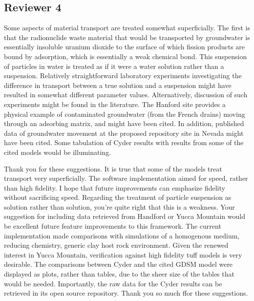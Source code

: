 \documentclass[answers,12pt]{exam}
\begin{document}
\begin{questions}
\section*{Reviewer 4}

\question  Some aspects of material transport are treated somewhat 
superficially. The
first is that the radionuclide waste material that would be transported by
groundwater is essentially insoluble uranium dioxide to the surface of which
fission products are bound by adsorption, which is essentially a weak chemical
bond.  This suspension of particles in water is treated as if it were a water
solution rather than a suspension.  Relatively straightforward laboratory
experiments investigating the difference in transport between a true solution
and a suspension might have resulted in somewhat different parameter values.
Alternatively, discussion of such experiments might be found in the literature.
The Hanford site provides a physical example of contaminated groundwater (from
the French drains) moving through an adsorbing matrix, and might have been
cited. In addition, published data of groundwater movement at the proposed
repository site in Nevada might have been cited.  Some tabulation of Cyder
results with results from some of the cited models would be illuminating.  
\begin{solution}
Thank you for these suggestions. It is true that some of the models treat 
        transport very superficially. The software implementation aimed for 
        speed, rather than high fidelity. I hope that future improvements can 
        emphasize fidelity without sacrificing speed. Regarding the treatment 
        of particle suspension as solution rather than solution, you're quite 
        right that this is a weakness. Your suggestion for including data 
        retrieved from Handford or Yucca Mountain would be excellent future 
        feature improvements to this framework. The current implementation made 
        comparisons with simulations of a homogenous medium, reducing 
        chemistry, generic clay host rock environment. Given the renewed 
        interest in Yucca Mountain, verification against high fidelity tuff 
        models is very desirable.  The comparisons between Cyder 
        and the cited GDSM model were displayed as plots, rather than tables, 
        due to the sheer size of the tables that would be needed. Importantly, 
        the raw data for the Cyder results can be retrieved in its open source 
        repository. Thank you so much ffor these suggestions. 
\end{solution}

\end{questions}
  
\end{document}
